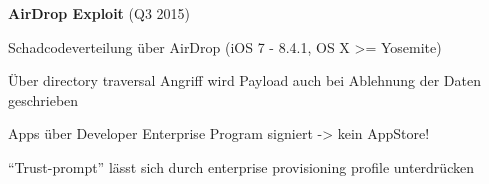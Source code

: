 \begin{frame}
	\centering
	\textbf{AirDrop Exploit} (Q3 2015)
	\begin{block}{}
		Schadcodeverteilung über AirDrop (iOS 7 - 8.4.1, OS X >= Yosemite)
	\end{block}
	\begin{block}{}
		Über directory traversal Angriff wird Payload auch bei Ablehnung der Daten
		geschrieben
	\end{block}
	\begin{block}{}
		Apps über Developer Enterprise Program signiert -> kein AppStore!
	\end{block}
	\begin{block}{}
		"`Trust-prompt"' lässt sich durch enterprise provisioning profile unterdrücken
	\end{block}
\end{frame}
